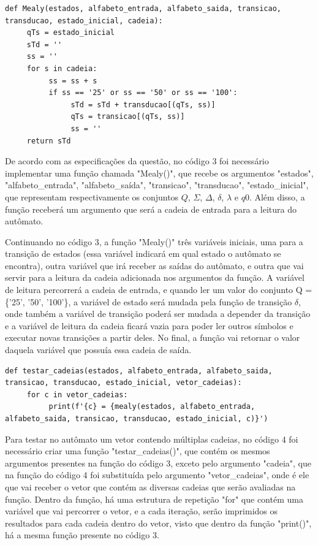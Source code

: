 \documentclass[12pt]{article}
\begin{document}
\begin{lstlisting}[style=Python, caption={Código do autômato da questão 3}]
def Mealy(estados, alfabeto_entrada, alfabeto_saida, transicao, transducao, estado_inicial, cadeia):
     qTs = estado_inicial
     sTd = ''
     ss = ''
     for s in cadeia:
          ss = ss + s
          if ss == '25' or ss == '50' or ss == '100':
               sTd = sTd + transducao[(qTs, ss)]
               qTs = transicao[(qTs, ss)]
               ss = ''
     return sTd
\end{lstlisting}

De acordo com as especificações da questão, no código 3 foi necessário implementar uma função chamada "Mealy()", que recebe os argumentos "estados", "alfabeto\_entrada", "alfabeto\_saída", "transicao", "transducao", "estado\_inicial", que representam respectivamente os conjuntos $Q$, $\Sigma$, $\Delta$, $\delta$, $\lambda$ e $q0$. Além disso, a função receberá um argumento que será a cadeia de entrada para a leitura do autômato.

Continuando no código 3, a função "Mealy()" três variáveis iniciais, uma para a transição de estados (essa variável indicará em qual estado o autômato se encontra), outra variável que irá receber as saídas do autômato, e outra que vai servir para a leitura da cadeia adicionada nos argumentos da função. A variável de leitura percorrerá a cadeia de entrada, e quando ler um valor do conjunto Q = \{'25', '50', '100'\}, a variável de estado será mudada pela função de transição $\delta$, onde também a variável de transição poderá ser mudada a depender da transição e a variável de leitura da cadeia ficará vazia para poder ler outros símbolos e executar novas transições a partir deles. No final, a função vai retornar o valor daquela variável que possuía essa cadeia de saída.

\begin{lstlisting}[style=Python, caption={Função para testar cadeias no autômato da questão 3}]
def testar_cadeias(estados, alfabeto_entrada, alfabeto_saida, transicao, transducao, estado_inicial, vetor_cadeias):
     for c in vetor_cadeias:
          print(f'{c} = {mealy(estados, alfabeto_entrada, alfabeto_saida, transicao, transducao, estado_inicial, c)}')
\end{lstlisting}

Para testar no autômato um vetor contendo múltiplas cadeias, no código 4 foi necessário criar uma função "testar\_cadeias()", que contém os mesmos argumentos presentes na função do código 3, exceto pelo argumento "cadeia", que na função do código 4 foi substituída pelo argumento "vetor\_cadeias", onde é ele que vai receber o vetor que contém as diversas cadeias que serão avaliadas na função. Dentro da função, há uma estrutura de repetição "for" que contém uma variável que vai percorrer o vetor, e a cada iteração, serão imprimidos os resultados para cada cadeia dentro do vetor, visto que dentro da função "print()", há a mesma função presente no código 3.
\end{document}
